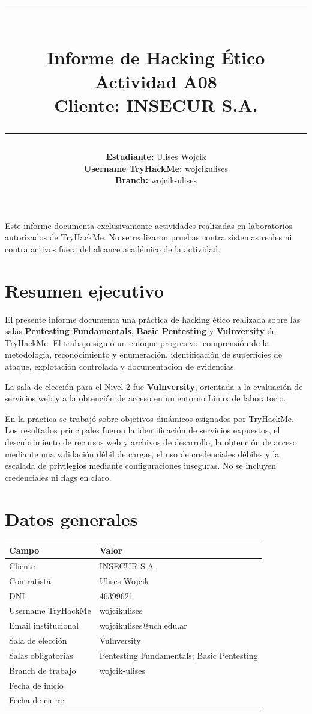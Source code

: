 \documentclass[11pt,a4paper]{article}
\title{\rule{\textwidth}{1pt}\\[0.3cm]
\textbf{\Large Informe de Hacking Ético}\\[0.2cm]
\textbf{\Large Actividad A08}\\[0.2cm]
\large Cliente: \textbf{INSECUR S.A.}\\[0.2cm]
\rule{\textwidth}{1pt}}
\author{\textbf{Estudiante:} Ulises Wojcik\\
\textbf{Username TryHackMe:} wojcikulises\\
\textbf{Branch:} wojcik-ulises}
\date{\dotfill}
\begin{document}
\maketitle
\thispagestyle{fancy}
\begin{alerta}
Este informe documenta exclusivamente actividades realizadas en laboratorios autorizados de TryHackMe. No se realizaron pruebas contra sistemas reales ni contra activos fuera del alcance académico de la actividad.
\end{alerta}
\tableofcontents
\newpage

\section{Resumen ejecutivo}

El presente informe documenta una práctica de hacking ético realizada sobre las salas \textbf{Pentesting Fundamentals}, \textbf{Basic Pentesting} y \textbf{Vulnversity} de TryHackMe. El trabajo siguió un enfoque progresivo: comprensión de la metodología, reconocimiento y enumeración, identificación de superficies de ataque, explotación controlada y documentación de evidencias.

La sala de elección para el Nivel 2 fue \textbf{Vulnversity}, orientada a la evaluación de servicios web y a la obtención de acceso en un entorno Linux de laboratorio.

En la práctica se trabajó sobre objetivos dinámicos asignados por TryHackMe. Los resultados principales fueron la identificación de servicios expuestos, el descubrimiento de recursos web y archivos de desarrollo, la obtención de acceso mediante una validación débil de cargas, el uso de credenciales débiles y la escalada de privilegios mediante configuraciones inseguras. No se incluyen credenciales ni flags en claro.

\section{Datos generales}

\begin{center}
\renewcommand{\arraystretch}{1.5}
\begin{tabularx}{\textwidth}{@{}p{5.5cm}X@{}}
\toprule
\textbf{Campo} & \textbf{Valor}\\
\midrule
Cliente & INSECUR S.A.\\
Contratista & Ulises Wojcik\\
DNI & 46399621\\
Username TryHackMe & wojcikulises\\
Email institucional & wojcikulises@uch.edu.ar\\
Sala de elección & Vulnversity\\
Salas obligatorias & Pentesting Fundamentals; Basic Pentesting\\
Branch de trabajo & wojcik-ulises\\
Fecha de inicio & \dotfill\\
Fecha de cierre & \dotfill\\
\bottomrule
\end{tabularx}
\end{center}
\end{document}
